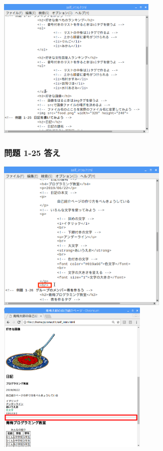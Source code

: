 \centering
\includegraphics[width=7.622cm]{text01-img/textbook-img236.png}
\flushleft

\bigskip

\subsubsection{\bfseries 問題 1-25 答え}

\centering
\includegraphics[width=8.186cm]{text01-img/textbook-img237.png}
\includegraphics[width=7.163cm]{text01-img/textbook-img238.png}
\flushleft

